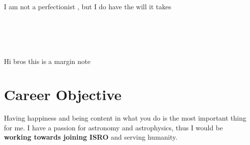 \documentclass[]{article}
\begin{document}
\begin{mdframed}[backgroundcolor=black]
~
\begin{center}
\begin{Huge}
\end{Huge}
\end{center}
\end{mdframed}
\begin{center}
\begin{large}
I am not a perfectionist , but I do have the will it takes
\end{large}
\end{center}
\begin{minipage}{0.2\linewidth}
~\\
~\\
~\\
~\\
Hi bros this is a margin note
\end{minipage}
\begin{minipage}{0.8\linewidth}
\section{Career Objective}
Having happiness and being content in what you do is the most important thing for me. I have a passion for astronomy and astrophysics, thus I would be \textbf{working towards joining ISRO} and serving humanity.
\end{minipage}
\end{document}
